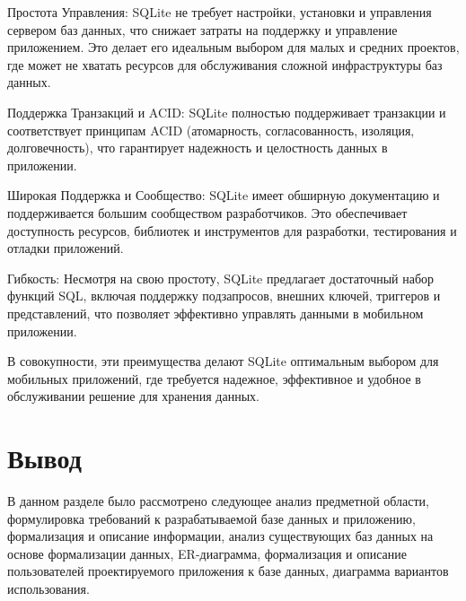 Простота Управления: SQLite не требует настройки, установки и управления сервером баз данных, что снижает затраты на поддержку и управление приложением. Это делает его идеальным выбором для малых и средних проектов, где может не хватать ресурсов для обслуживания сложной инфраструктуры баз данных.

Поддержка Транзакций и ACID: SQLite полностью поддерживает транзакции и соответствует принципам ACID (атомарность, согласованность, изоляция, долговечность), что гарантирует надежность и целостность данных в приложении.

Широкая Поддержка и Сообщество: SQLite имеет обширную документацию и поддерживается большим сообществом разработчиков. Это обеспечивает доступность ресурсов, библиотек и инструментов для разработки, тестирования и отладки приложений.

Гибкость: Несмотря на свою простоту, SQLite предлагает достаточный набор функций SQL, включая поддержку подзапросов, внешних ключей, триггеров и представлений, что позволяет эффективно управлять данными в мобильном приложении.

В совокупности, эти преимущества делают SQLite оптимальным выбором для мобильных приложений, где требуется надежное, эффективное и удобное в обслуживании решение для хранения данных.


\section *{Вывод}
В данном разделе было рассмотрено следующее анализ предметной области, формулировка требований к разрабатываемой базе данных и приложению, формализация и описание информации, анализ существующих баз данных на основе формализации данных, ER-диаграмма, формализация и описание пользователей проектируемого приложения к базе данных, диаграмма вариантов использования.